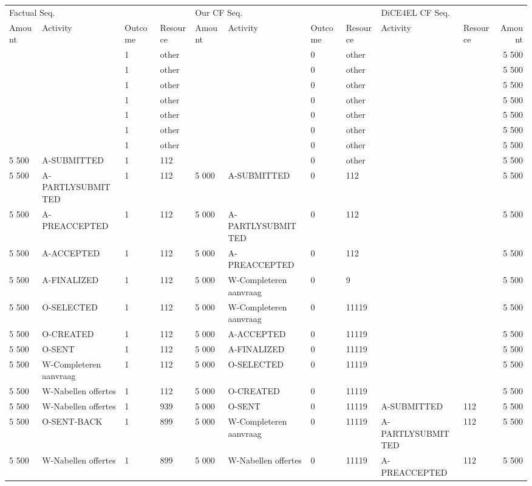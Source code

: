 \begin{tabular}{llllllllllr}
\toprule
\multicolumn{4}{l}{Factual Seq.} & \multicolumn{4}{l}{Our CF Seq.} & \multicolumn{3}{l}{DiCE4EL CF Seq.} \\
Amount & Activity & Outcome & Resource & Amount & Activity & Outcome & Resource & Activity & Resource & Amount \\
\midrule
 &  & 1 & other &  &  & 0 & other &  &  & 5 500 \\
 &  & 1 & other &  &  & 0 & other &  &  & 5 500 \\
 &  & 1 & other &  &  & 0 & other &  &  & 5 500 \\
 &  & 1 & other &  &  & 0 & other &  &  & 5 500 \\
 &  & 1 & other &  &  & 0 & other &  &  & 5 500 \\
 &  & 1 & other &  &  & 0 & other &  &  & 5 500 \\
 &  & 1 & other &  &  & 0 & other &  &  & 5 500 \\
5 500 & A-SUBMITTED & 1 & 112 &  &  & 0 & other &  &  & 5 500 \\
5 500 & A-PARTLYSUBMITTED & 1 & 112 & 5 000 & A-SUBMITTED & 0 & 112 &  &  & 5 500 \\
5 500 & A-PREACCEPTED & 1 & 112 & 5 000 & A-PARTLYSUBMITTED & 0 & 112 &  &  & 5 500 \\
5 500 & A-ACCEPTED & 1 & 112 & 5 000 & A-PREACCEPTED & 0 & 112 &  &  & 5 500 \\
5 500 & A-FINALIZED & 1 & 112 & 5 000 & W-Completeren aanvraag & 0 & 9 &  &  & 5 500 \\
5 500 & O-SELECTED & 1 & 112 & 5 000 & W-Completeren aanvraag & 0 & 11119 &  &  & 5 500 \\
5 500 & O-CREATED & 1 & 112 & 5 000 & A-ACCEPTED & 0 & 11119 &  &  & 5 500 \\
5 500 & O-SENT & 1 & 112 & 5 000 & A-FINALIZED & 0 & 11119 &  &  & 5 500 \\
5 500 & W-Completeren aanvraag & 1 & 112 & 5 000 & O-SELECTED & 0 & 11119 &  &  & 5 500 \\
5 500 & W-Nabellen offertes & 1 & 112 & 5 000 & O-CREATED & 0 & 11119 &  &  & 5 500 \\
5 500 & W-Nabellen offertes & 1 & 939 & 5 000 & O-SENT & 0 & 11119 & A-SUBMITTED & 112 & 5 500 \\
5 500 & O-SENT-BACK & 1 & 899 & 5 000 & W-Completeren aanvraag & 0 & 11119 & A-PARTLYSUBMITTED & 112 & 5 500 \\
5 500 & W-Nabellen offertes & 1 & 899 & 5 000 & W-Nabellen offertes & 0 & 11119 & A-PREACCEPTED & 112 & 5 500 \\

\end{tabular}
